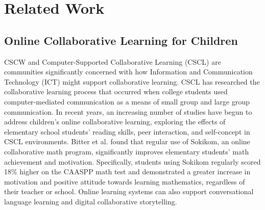 \section{Related Work}
\subsection{Online Collaborative Learning for Children}

CSCW and Computer-Supported Collaborative Learning (CSCL) are communities significantly concerned with how Information and Communication Technology (ICT) might support collaborative learning\citep{ludvigsen2010computer,liaqat2020leveraging,yadav2019leap}. CSCL has researched the collaborative learning process that occurred when college students used computer-mediated communication as a means of small group and large group communication\citep{stacey1999collaborative}. In recent years, an increasing number of studies have begun to address children's online collaborative learning, exploring the effects of elementary school students' reading skills, peer interaction, and self-concept in CSCL environments\citep{tsuei2011development,bouta2013enhancing,hourcade2002kidpad}. Bitter et al.\citep{bitter2016effects} found that regular use of Sokikom, an online collaborative math program, significantly improves elementary students' math achievement and motivation. Specifically, students using Sokikom regularly scored 18\% higher on the CAASPP math test and demonstrated a greater increase in motivation and positive attitude towards learning mathematics, regardless of their teacher or school. Online learning systems can also support conversational language learning and digital collaborative storytelling\citep{sharma2019exploring}.

